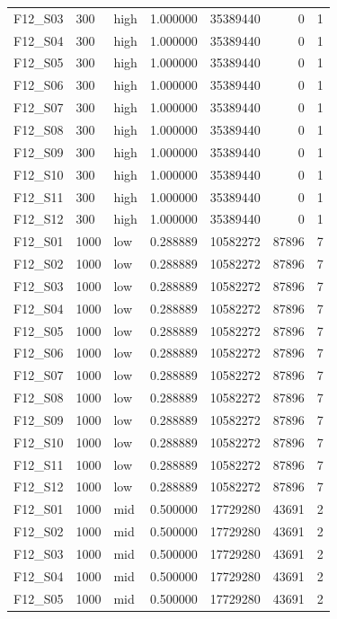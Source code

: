 \begin{longtable}{lllr r r r}
F12\_S03 & 300 & high & 1.000000 & 35389440 & 0 & 1 \\
F12\_S04 & 300 & high & 1.000000 & 35389440 & 0 & 1 \\
F12\_S05 & 300 & high & 1.000000 & 35389440 & 0 & 1 \\
F12\_S06 & 300 & high & 1.000000 & 35389440 & 0 & 1 \\
F12\_S07 & 300 & high & 1.000000 & 35389440 & 0 & 1 \\
F12\_S08 & 300 & high & 1.000000 & 35389440 & 0 & 1 \\
F12\_S09 & 300 & high & 1.000000 & 35389440 & 0 & 1 \\
F12\_S10 & 300 & high & 1.000000 & 35389440 & 0 & 1 \\
F12\_S11 & 300 & high & 1.000000 & 35389440 & 0 & 1 \\
F12\_S12 & 300 & high & 1.000000 & 35389440 & 0 & 1 \\
F12\_S01 & 1000 & low & 0.288889 & 10582272 & 87896 & 7 \\
F12\_S02 & 1000 & low & 0.288889 & 10582272 & 87896 & 7 \\
F12\_S03 & 1000 & low & 0.288889 & 10582272 & 87896 & 7 \\
F12\_S04 & 1000 & low & 0.288889 & 10582272 & 87896 & 7 \\
F12\_S05 & 1000 & low & 0.288889 & 10582272 & 87896 & 7 \\
F12\_S06 & 1000 & low & 0.288889 & 10582272 & 87896 & 7 \\
F12\_S07 & 1000 & low & 0.288889 & 10582272 & 87896 & 7 \\
F12\_S08 & 1000 & low & 0.288889 & 10582272 & 87896 & 7 \\
F12\_S09 & 1000 & low & 0.288889 & 10582272 & 87896 & 7 \\
F12\_S10 & 1000 & low & 0.288889 & 10582272 & 87896 & 7 \\
F12\_S11 & 1000 & low & 0.288889 & 10582272 & 87896 & 7 \\
F12\_S12 & 1000 & low & 0.288889 & 10582272 & 87896 & 7 \\
F12\_S01 & 1000 & mid & 0.500000 & 17729280 & 43691 & 2 \\
F12\_S02 & 1000 & mid & 0.500000 & 17729280 & 43691 & 2 \\
F12\_S03 & 1000 & mid & 0.500000 & 17729280 & 43691 & 2 \\
F12\_S04 & 1000 & mid & 0.500000 & 17729280 & 43691 & 2 \\
F12\_S05 & 1000 & mid & 0.500000 & 17729280 & 43691 & 2 \\

\end{longtable}
